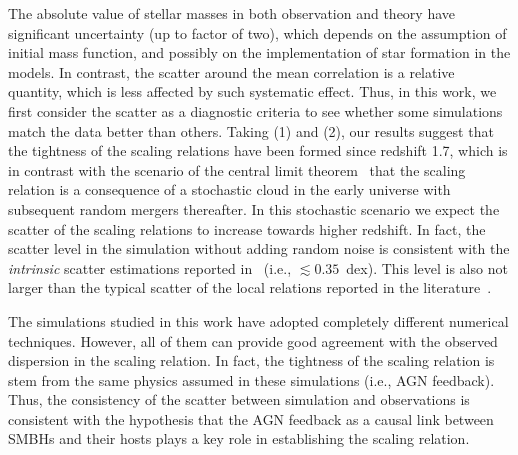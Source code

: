 \documentclass[twocolumn]{aastex631}
\begin{document}
The absolute value of stellar masses in both observation and theory have significant uncertainty (up to factor of two), which depends on the assumption of initial mass function, and possibly on the implementation of star formation in the models. In contrast, the scatter around the mean correlation is a relative quantity, which is less affected by such systematic effect. Thus, in this work, we first consider the scatter as a diagnostic criteria to see whether some simulations match the data better than others. Taking (1) and (2), our results suggest that the tightness of the scaling relations have been formed since redshift 1.7, which is in contrast with the scenario of the central limit theorem~\citep{Peng2007, Jahnke2011, Hirschmann2010} that the scaling relation is a consequence of a stochastic cloud in the early universe with subsequent random mergers thereafter. In this stochastic scenario we expect the scatter of the scaling relations to increase towards higher redshift. In fact, the scatter level in the simulation without adding random noise is consistent with the {\it intrinsic} scatter estimations reported in~\citet{Ding2020, 2021arXiv210902751L} (i.e., $\lesssim0.35$~dex). This level is also not larger than the typical scatter of the local relations reported in the literature~\citep{Kormendy13, Gul++09, Reines2015}.

The simulations studied in this work have adopted completely different numerical techniques. However, all of them can provide good agreement with the observed dispersion in the scaling relation. In fact, the tightness of the scaling relation is stem from the same physics assumed in these simulations (i.e., AGN feedback). Thus, the consistency of the scatter between simulation and observations is consistent with the hypothesis that the AGN feedback as a causal link between SMBHs and their hosts plays a key role in establishing the scaling relation. 
\end{document}

